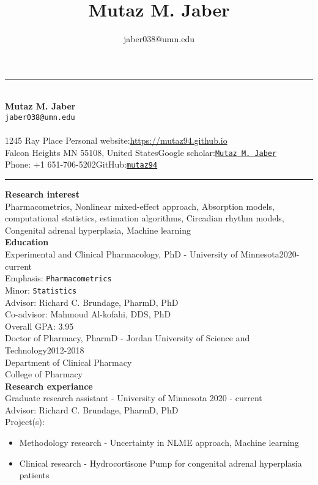 \documentclass[a4paper,11pt]{article}
\title{\LARGE\bfseries Mutaz M. \textbf{Jaber}}
\author{jaber038@umn.edu}
\date{}
\begin{document}
\rule{\textwidth}{1pt}
~\\[0.5cm]
{\centering\textbf{\LARGE Mutaz M. Jaber}\\[0.1cm] \texttt{jaber038@umn.edu} \\[-0.2cm]}
~\\[0.1cm]
1245 Ray Place \hfill Personal website:\href{https://mutaz94.github.io/}{https://mutaz94.github.io}\\
Falcon Heights MN 55108, United States\hfill Google scholar:\href{https://scholar.google.com/citations?user=uugc-IgAAAAJ&hl=en&authuser=1}{\texttt{Mutaz M. Jaber}}\\
Phone: +1 651-706-5202\hfill GitHub:\href{https://github.com/Mutaz94}{\texttt{mutaz94}}\\
\rule{\textwidth}{1pt}

\textbf{Research interest}\\
Pharmacometrics, Nonlinear mixed-effect approach, Absorption models, computational statistics, estimation algorithms, Circadian rhythm models, Congenital adrenal hyperplasia, Machine learning\\

\textbf{Education}\\[-0.3cm]

Experimental and Clinical Pharmacology, PhD - University of Minnesota\hfill 2020-current\\
Emphasis: \texttt{Pharmacometrics}\\
Minor: \texttt{Statistics}\\
Advisor: Richard C. Brundage, PharmD, PhD\\
Co-advisor: Mahmoud Al-kofahi, DDS, PhD\\
Overall GPA: 3.95\\[0.5cm]

Doctor of Pharmacy, PharmD - Jordan University of Science and Technology\hfill 2012-2018\\
Department of Clinical Pharmacy\\
College of Pharmacy\\[1cm]

\textbf{Research experiance}\\[-0.3cm]


Graduate research assistant - University of Minnesota \hfill 2020 - current \\
Advisor: Richard C. Brundage, PharmD, PhD \\
Project(s):
\begin{itemize}
\item Methodology research - Uncertainty in NLME approach, Machine learning
\item Clinical research - Hydrocortisone Pump for congenital adrenal hyperplasia patients
\end{itemize}
\end{document}
